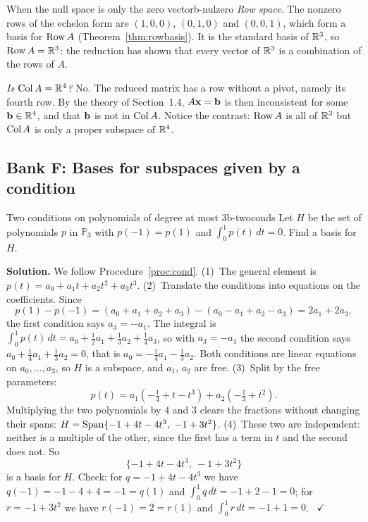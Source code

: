 \documentclass[11pt]{article}
\begin{document}
\begin{exmp}{When the null space is only the zero vector}{b-nulzero}
\emph{Row space.} The nonzero rows of the echelon form are $(1,0,0)$, $(0,1,0)$ and $(0,0,1)$, which form a basis for $\operatorname{Row} A$ (Theorem~\ref{thm:rowbasis}). It is the standard basis of $\mathbb{R}^3$, so $\operatorname{Row} A=\mathbb{R}^3$: the reduction has shown that every vector of $\mathbb{R}^3$ is a combination of the rows of $A$.

\emph{Is $\operatorname{Col} A=\mathbb{R}^4$?} No. The reduced matrix has a row without a pivot, namely its fourth row. By the theory of Section~1.4, $A\mathbf{x}=\mathbf{b}$ is then inconsistent for some $\mathbf{b}\in\mathbb{R}^4$, and that $\mathbf{b}$ is not in $\operatorname{Col} A$. Notice the contrast: $\operatorname{Row} A$ is all of $\mathbb{R}^3$ but $\operatorname{Col} A$ is only a proper subspace of $\mathbb{R}^4$.
\end{exmp}

\subsection*{Bank F: Bases for subspaces given by a condition}

\begin{exmp}{Two conditions on polynomials of degree at most $3$}{b-twoconds}
Let $H$ be the set of polynomials $p$ in $\mathbb{P}_3$ with $p(-1)=p(1)$ and $\int_0^1p(t)\,dt=0$. Find a basis for $H$.

\textbf{Solution.} We follow Procedure~\ref{proc:cond}. (1)~The general element is $p(t)=a_0+a_1t+a_2t^2+a_3t^3$. (2)~Translate the conditions into equations on the coefficients. Since
\[
p(1)-p(-1)=(a_0+a_1+a_2+a_3)-(a_0-a_1+a_2-a_3)=2a_1+2a_3,
\]
the first condition says $a_3=-a_1$. The integral is $\int_0^1p(t)\,dt=a_0+\tfrac12a_1+\tfrac13a_2+\tfrac14a_3$, so with $a_3=-a_1$ the second condition says $a_0+\tfrac14a_1+\tfrac13a_2=0$, that is $a_0=-\tfrac14a_1-\tfrac13a_2$. Both conditions are linear equations on $a_0,\dots,a_3$, so $H$ is a subspace, and $a_1$, $a_2$ are free. (3)~Split by the free parameters:
\[
p(t)=a_1\left(-\tfrac14+t-t^3\right)+a_2\left(-\tfrac13+t^2\right).
\]
Multiplying the two polynomials by $4$ and $3$ clears the fractions without changing their spans: $H=\operatorname{Span}\{-1+4t-4t^3,\ -1+3t^2\}$. (4)~These two are independent: neither is a multiple of the other, since the first has a term in $t$ and the second does not. So
\[
\{-1+4t-4t^3,\ -1+3t^2\}
\]
is a basis for $H$. Check: for $q=-1+4t-4t^3$ we have $q(-1)=-1-4+4=-1=q(1)$ and $\int_0^1q\,dt=-1+2-1=0$; for $r=-1+3t^2$ we have $r(-1)=2=r(1)$ and $\int_0^1r\,dt=-1+1=0$. \ $\checkmark$
\end{exmp}
\end{document}
